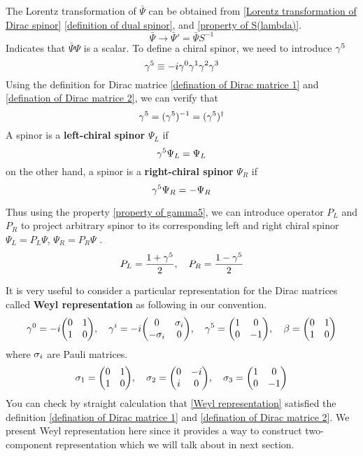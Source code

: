 The Lorentz transformation of $\bar{\Psi}$ can be obtained from \eqref{Lorentz transformation of Dirac spinor}  \eqref{definition of dual spinor}, and \eqref{property of S(lambda)}.
\begin{equation} \label{Lorentz transformation of barPsi}
\bar\Psi \rightarrow \bar{\Psi}' = \bar{\Psi}S^{-1}
\end{equation}
Indicates that $\bar{\Psi}\Psi$ is a scalar.
To define a chiral spinor, we need to introduce $\gamma^5$
\begin{equation}
  \gamma^5 \equiv -i\gamma^0\gamma^1\gamma^2\gamma^3
\end{equation}
Using the definition for Dirac matrice \eqref{defination of Dirac matrice 1} and \eqref{defination of Dirac matrice 2}, we can verify that
\begin{equation} \label{property of gamma5}
\gamma^5 =(\gamma^5)^{-1} = (\gamma^5)^{\dagger}
\end{equation}
A spinor is a \textbf{left-chiral spinor} $\Psi_L$ if
\begin{equation} \label{definition of left chiral spinor}
\gamma^5\Psi_L = \Psi_L
\end{equation}
on the other hand, a spinor is a \textbf{right-chiral spinor} $\Psi_R$ if
\begin{equation} \label{definition of right chiral spinor}
\gamma^5 \Psi_R = -\Psi_R
\end{equation}


Thus using the property \eqref{property of gamma5}, we can introduce operator $P_L$ and $P_R$ to project arbitrary spinor to its corresponding left and right chiral spinor $\Psi_L = P_L\Psi$, $\Psi_R = P_R\Psi$ .
\begin{equation}
  P_L = \frac{1+\gamma^5}{2} ,\quad P_R = \frac{1-\gamma^5}{2}
\end{equation}

It is very useful to consider a particular representation for the Dirac matrices called \textbf{Weyl representation} as following in our convention. 
\begin{equation} \label{Weyl representation}
\g^0 = -i \mqty(  0 &  1\\
                 1  &  0),\quad
\g^i = -i \mqty(  0 &  \s_{i}\\
             -\s_{i}&   0   ),\quad
\g^5 = \mqty(  1 &  0\\
               0 & -1),\quad
\be = \mqty(  0  &  1\\
              1  &  0)
\end{equation}
where $\sigma_i$ are Pauli matrices.
\begin{equation} \label{Pauli matrice}
\s_1 = \mqty( 0 & 1 \\
              1 & 0),\quad
\s_2 = \mqty( 0 & -i \\
              i & 0),\quad
\s_3 = \mqty( 1 & 0 \\
              0 & -1)
\end{equation}
You can check by straight calculation that \eqref{Weyl representation} satisfied the definition \eqref{defination of Dirac matrice 1} and \eqref{defination of Dirac matrice 2}. We present Weyl representation here since it provides a way to construct two-component representation which we will talk about in next section.

